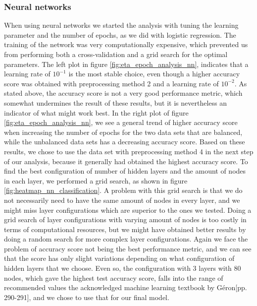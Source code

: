 \subsubsection{Neural networks}
When using neural networks we started the analysis with tuning the learning parameter and the number of epochs, as we did with logistic regression. The training of the network was very computationally expensive, which prevented us from performing both a cross-validation and a grid search for the optimal parameters. The left plot in figure \ref{fig:eta_epoch_analysis_nn}, indicates that a learning rate of $10^{-1}$ is the most stable choice, even though a higher accuracy score was obtained with preprocessing method 2 and a learning rate of $10^{-2}$. As stated above, the accuracy score is not a very good performance metric, which somewhat undermines the result of these results, but it is nevertheless an indicator of what might work best. In the right plot of figure \ref{fig:eta_epoch_analysis_nn}, we see a general trend of higher accuracy score when increasing the number of epochs for the two data sets that are balanced, while the unbalanced data sets has a decreasing accuracy score. Based on these results, we chose to use the data set with preprocessing method 4 in the next step of our analysis, because it generally had obtained the highest accuracy score. To find the best configuration of number of hidden layers and the amount of nodes in each layer, we performed a grid search, as shown in figure \ref{fig:heatmap_nn_classification}. A problem with this grid search is that we do not necessarily need to have the same amount of nodes in every layer, and we might miss layer configurations which are superior to the ones we tested. Doing a grid search of layer configurations with varying amount of nodes is too costly in terms of computational resources, but we might have obtained better results by doing a random search for more complex layer configurations. Again we face the problem of accuracy score not being the best performance metric, and we can see that the score has only slight variations depending on what configuration of hidden layers that we choose. Even so, the configuration with 3 layers with 80 nodes, which gave the highest test accuracy score, falls into the range of recommended values the acknowledged machine learning textbook by Géron\cite{geron}[pp. 290-291], and we chose to use that for our final model.




